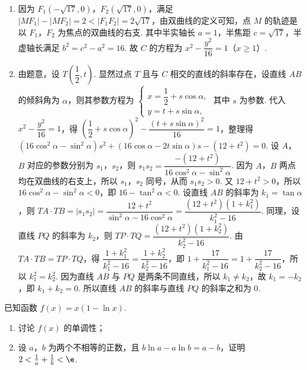 \begin{solution}
\begin{enumerate}
    \item 因为 \(F_1(-\sqrt{17},0)\)，\(F_2(\sqrt{17},0)\)，满足 \(|MF_1|-|MF_2|=2<|F_1F_2|=2\sqrt{17}\)，由双曲线的定义可知，点 \(M\) 的轨迹是以 \(F_1\)，\(F_2\) 为焦点的双曲线的右支. 其中半实轴长 \(a=1\)，半焦距 \(c=\sqrt{17}\)，半虚轴长满足 \(b^2=c^2-a^2=16\). 故 \(C\) 的方程为 \(x^2-\dfrac{y^2}{16}=1\)（\(x\ge1\)）.
    \item 由题意，设 \(T\left(\dfrac12,t\right)\). 显然过点 \(T\) 且与 \(C\) 相交的直线的斜率存在，设直线 \(AB\) 的倾斜角为 \(\alpha\)，则其参数方程为
    \(\begin{cases}
    x=\dfrac12+s\cos\alpha,\\
    y=t+s\sin\alpha,
    \end{cases}\)
    其中 \(s\) 为参数. 代入 \(x^2-\dfrac{y^2}{16}=1\)，得 \(\left(\dfrac12+s\cos\alpha\right)^2-\dfrac{(t+s\sin\alpha)^2}{16}=1\)，整理得 \((16\cos^2\alpha-\sin^2\alpha)s^2+(16\cos\alpha-2t\sin\alpha)s-(12+t^2)=0\). 设 \(A\)，\(B\) 对应的参数分别为 \(s_1\)，\(s_2\)，则 \(s_1s_2=\dfrac{-(12+t^2)}{16\cos^2\alpha-\sin^2\alpha}\). 因为 \(A\)，\(B\) 两点均在双曲线的右支上，所以 \(s_1\)，\(s_2\) 同号，从而 \(s_1s_2>0\). 又 \(12+t^2>0\)，所以 \(16\cos^2\alpha-\sin^2\alpha<0\)，即 \(16-\tan^2\alpha<0\). 设直线 \(AB\) 的斜率为 \(k_1=\tan\alpha\)，则 \(TA\cdot TB=|s_1s_2|=\dfrac{12+t^2}{\sin^2\alpha-16\cos^2\alpha}=\dfrac{(12+t^2)(1+k_1^2)}{k_1^2-16}\). 同理，设直线 \(PQ\) 的斜率为 \(k_2\)，则 \(TP\cdot TQ=\dfrac{(12+t^2)(1+k_2^2)}{k_2^2-16}\). 由 \(TA\cdot TB=TP\cdot TQ\)，得 \(\dfrac{1+k_1^2}{k_1^2-16}=\dfrac{1+k_2^2}{k_2^2-16}\)，即 \(1+\dfrac{17}{k_1^2-16}=1+\dfrac{17}{k_2^2-16}\)，所以 \(k_1^2=k_2^2\). 因为直线 \(AB\) 与 \(PQ\) 是两条不同直线，所以 \(k_1\ne k_2\)，故 \(k_1=-k_2\)，即 \(k_1+k_2=0\). 所以直线 \(AB\) 的斜率与直线 \(PQ\) 的斜率之和为 \(0\).
\end{enumerate}
\end{solution}

\begin{problem}
已知函数 \(f(x)=x\left( 1-\ln x \right)\).

\begin{enumerate}
\item 讨论 \(f(x)\) 的单调性；
\item 设 \(a\)，\(b\) 为两个不相等的正数，且 \(b\ln a-a\ln b=a-b\)，证明 \(2<\frac{1}{a}+\frac{1}{b}<\e\).
\end{enumerate}
\end{problem}

